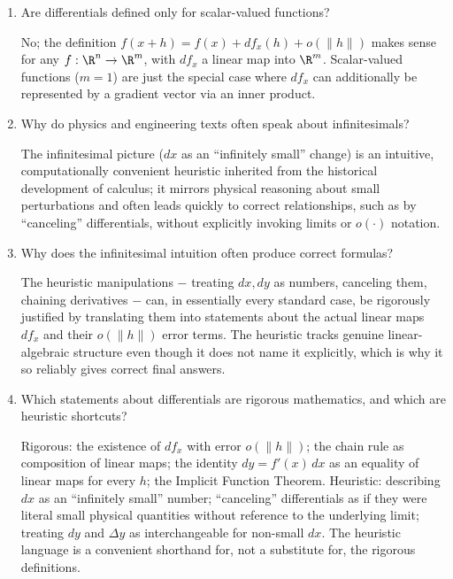 \documentclass{self-check}
\begin{document}
\begin{enumerate}[resume, leftmargin=*, itemsep=8pt]
\begin{answer}
    \end{answer}
  \item Are differentials defined only for scalar-valued functions?
    \begin{answer}
      No; the definition \(f(x+h)=f(x)+df_{x}(h)+o(\|h\|)\) makes sense for any \(f:\R^{n}\to\R^{m}\), with \(df_{x}\) a linear map into \(\R^{m}\). Scalar-valued functions (\(m=1\)) are just the special case where \(df_{x}\) can additionally be represented by a gradient vector via an inner product.
    \end{answer}
  \item Why do physics and engineering texts often speak about infinitesimals?
    \begin{answer}
      The infinitesimal picture (\(dx\) as an ``infinitely small'' change) is an intuitive, computationally convenient heuristic inherited from the historical development of calculus; it mirrors physical reasoning about small perturbations and often leads quickly to correct relationships, such as by ``canceling'' differentials, without explicitly invoking limits or \(o(\cdot)\) notation.
    \end{answer}
  \item Why does the infinitesimal intuition often produce correct formulas?
    \begin{answer}
      The heuristic manipulations \(-\) treating \(dx,dy\) as numbers, canceling them, chaining derivatives \(-\) can, in essentially every standard case, be rigorously justified by translating them into statements about the actual linear maps \(df_{x}\) and their \(o(\|h\|)\) error terms. The heuristic tracks genuine linear-algebraic structure even though it does not name it explicitly, which is why it so reliably gives correct final answers.
    \end{answer}
  \item Which statements about differentials are rigorous mathematics, and which are heuristic shortcuts?
    \begin{answer}
      Rigorous: the existence of \(df_{x}\) with error \(o(\|h\|)\); the chain rule as composition of linear maps; the identity \(dy=f'(x)\,dx\) as an equality of linear maps for every \(h\); the Implicit Function Theorem. Heuristic: describing \(dx\) as an ``infinitely small'' number; ``canceling'' differentials as if they were literal small physical quantities without reference to the underlying limit; treating \(dy\) and \(\Delta y\) as interchangeable for non-small \(dx\). The heuristic language is a convenient shorthand for, not a substitute for, the rigorous definitions.
    \end{answer}
\end{enumerate}
\end{document}
